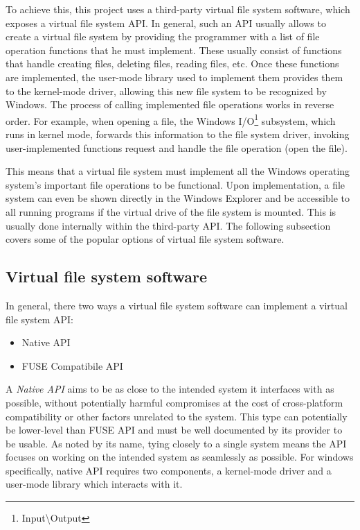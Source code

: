 To achieve this, this project uses a third-party virtual file system software, which exposes a virtual file system API. In general, such an API usually allows to create a virtual file system by providing the programmer with a list of file operation functions that he must implement. These usually consist of functions that handle creating files, deleting files, reading files, etc. Once these functions are implemented, the user-mode library used to implement them provides them to the kernel-mode driver, allowing this new file system to be recognized by Windows. The process of calling implemented file operations works in reverse order. For example, when opening a file, the Windows I/O\footnote{Input\textbackslash{}Output} subsystem, which runs in kernel mode, forwards this information to the file system driver, invoking user-implemented functions request and handle the file operation (open the file).\cite{GitDokany}

This means that a virtual file system must implement all the Windows operating system's important file operations to be functional. Upon implementation, a file system can even be shown directly in the Windows Explorer and be accessible to all running programs if the virtual drive of the file system is mounted. This is usually done internally within the third-party API. The following subsection covers some of the popular options of virtual file system software.

\subsection{Virtual file system software}
\label{vfsapitypes}
In general, there two ways a virtual file system software can implement a virtual file system API:

\begin{itemize}
    \item Native API
    \item FUSE Compatibile API
\end{itemize}

A \textit{Native API} aims to be as close to the intended system it interfaces with as possible, without potentially harmful compromises at the cost of cross-platform compatibility or other factors unrelated to the system. This type can potentially be lower-level than FUSE API and must be well documented by its provider to be usable. As noted by its name, tying closely to a single system means the API focuses on working on the intended system as seamlessly as possible. For windows specifically, native API requires two components, a kernel-mode driver and a user-mode library which interacts with it.

